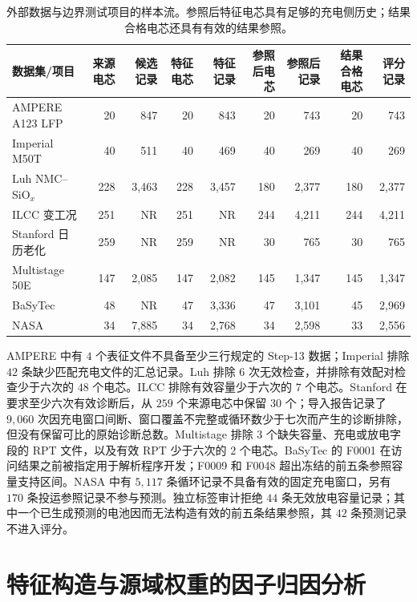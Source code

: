 \documentclass[UTF8,11pt]{ctexart}
\begin{document}
\begin{landscape}
\begin{table}[H]
\centering
\caption{外部数据与边界测试项目的样本流。参照后特征电芯具有足够的充电侧历史；结果合格电芯还具有有效的结果参照。}
\label{tab:external_flow_zh}
\scriptsize
\setlength{\tabcolsep}{3.7pt}
\renewcommand{\arraystretch}{1.05}
\begin{tabular}{@{}lrrrrrrrr@{}}
\toprule
数据集/项目 & 来源电芯 & 候选记录 & 特征电芯 & 特征记录 & 参照后电芯 & 参照后记录 & 结果合格电芯 & 评分记录 \\
\midrule
AMPERE A123 LFP & 20 & 847 & 20 & 843 & 20 & 743 & 20 & 743 \\
Imperial M50T & 40 & 511 & 40 & 469 & 40 & 269 & 40 & 269 \\
Luh NMC--SiO$_x$ & 228 & 3,463 & 228 & 3,457 & 180 & 2,377 & 180 & 2,377 \\
ILCC 变工况 & 251 & NR & 251 & NR & 244 & 4,211 & 244 & 4,211 \\
Stanford 日历老化 & 259 & NR & 259 & NR & 30 & 765 & 30 & 765 \\
Multistage 50E & 147 & 2,085 & 147 & 2,082 & 145 & 1,347 & 145 & 1,347 \\
BaSyTec & 48 & NR & 47 & 3,336 & 47 & 3,101 & 45 & 2,969 \\
NASA & 34 & 7,885 & 34 & 2,768 & 34 & 2,598 & 33 & 2,556 \\
\bottomrule
\end{tabular}
\end{table}
\end{landscape}

AMPERE 中有 $4$ 个表征文件不具备至少三行规定的 Step-13 数据；Imperial 排除 $42$ 条缺少匹配充电文件的汇总记录。Luh 排除 $6$ 次无效检查，并排除有效配对检查少于六次的 $48$ 个电芯。ILCC 排除有效容量少于六次的 $7$ 个电芯。Stanford 在要求至少六次有效诊断后，从 $259$ 个来源电芯中保留 $30$ 个；导入报告记录了 $9{,}060$ 次因充电窗口间断、窗口覆盖不完整或循环数少于七次而产生的诊断排除，但没有保留可比的原始诊断总数。Multistage 排除 $3$ 个缺失容量、充电或放电字段的 RPT 文件，以及有效 RPT 少于六次的 $2$ 个电芯。BaSyTec 的 F0001 在访问结果之前被指定用于解析程序开发；F0009 和 F0048 超出冻结的前五条参照容量支持区间。NASA 中有 $5{,}117$ 条循环记录不具备有效的固定充电窗口，另有 $170$ 条投运参照记录不参与预测。独立标签审计拒绝 $44$ 条无效放电容量记录；其中一个已生成预测的电池因而无法构造有效的前五条结果参照，其 $42$ 条预测记录不进入评分。

\section{特征构造与源域权重的因子归因分析}
\end{document}
